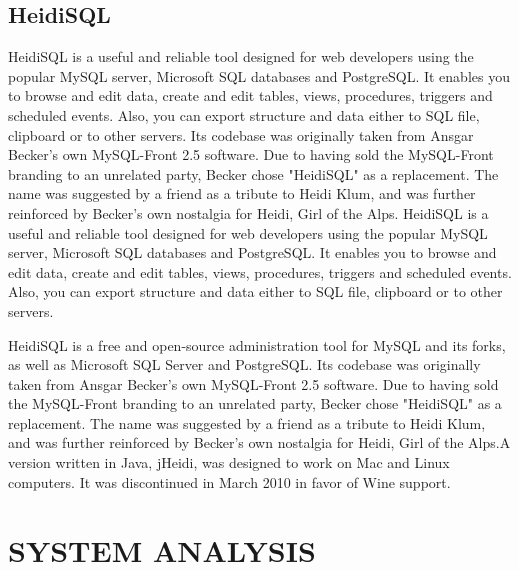 \documentclass[a4paper,12pt]{article}
\begin{document}
\subsection{HeidiSQL}
HeidiSQL is a useful and reliable tool designed for web developers using the popular MySQL server, Microsoft SQL databases and PostgreSQL. It enables you to browse and edit data, create and edit tables, views, procedures, triggers and scheduled events. Also, you can export structure and data either to SQL file, clipboard or to other servers. Its codebase was originally taken from Ansgar Becker's own MySQL-Front 2.5 software. Due to having sold the MySQL-Front branding to an unrelated party, Becker chose "HeidiSQL" as a replacement. The name was suggested by a friend as a tribute to Heidi Klum, and was further reinforced by Becker's own nostalgia for Heidi, Girl of the Alps. HeidiSQL is a useful and reliable tool designed for web developers using the popular MySQL server, Microsoft SQL databases and PostgreSQL. It enables you to browse and edit data, create and edit tables, views, procedures, triggers and scheduled events. Also, you can export structure and data either to SQL file, clipboard or to other servers.

HeidiSQL is a free and open-source administration tool for MySQL and its forks, as well as Microsoft SQL Server and PostgreSQL. Its codebase was originally taken from Ansgar Becker's own MySQL-Front 2.5 software. Due to having sold the MySQL-Front branding to an unrelated party, Becker chose "HeidiSQL" as a replacement. The name was suggested by a friend as a tribute to Heidi Klum, and was further reinforced by Becker's own nostalgia for Heidi, Girl of the Alps.A version written in Java, jHeidi, was designed to work on Mac and Linux computers. It was discontinued in March 2010 in favor of Wine support.
\newpage
\section{SYSTEM ANALYSIS}
\hspace{5mm}
\end{document}
